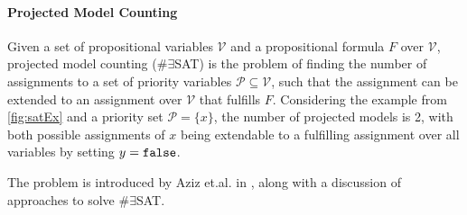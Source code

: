 \paragraph*{Projected Model Counting}
Given a set of propositional variables $\mathcal{V}$ and a propositional formula $F$ over $\mathcal{V}$, projected model counting (\#$\exists$SAT) is the problem of finding the number of assignments to a set of priority variables $\mathcal{P} \subseteq \mathcal{V}$, such that the assignment can be extended to an assignment over $\mathcal{V}$ that fulfills $F$. Considering the example from \ref{fig:satEx} and a priority set $\mathcal{P} = \{x\}$, the number of projected models is 2, with both possible assignments of $x$ being extendable to a fulfilling assignment over all variables by setting $y = \mathtt{false}$.

The problem is introduced by Aziz et.al. in \cite{aziz15}, along with a discussion of approaches to solve \#$\exists$SAT. 



